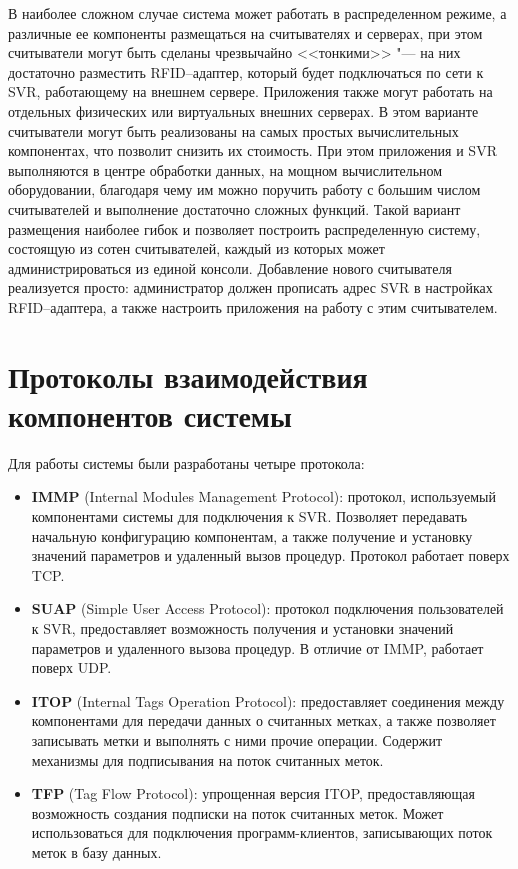 В наиболее сложном случае система может работать в распределенном режиме, а различные ее компоненты размещаться на считывателях и серверах, при этом считыватели могут быть сделаны чрезвычайно <<тонкими>> "--- на них достаточно разместить RFID--адаптер, который будет подключаться по сети к SVR, работающему на внешнем сервере. Приложения также могут работать на отдельных физических или виртуальных внешних серверах. В этом варианте считыватели могут быть реализованы на самых простых вычислительных компонентах, что позволит снизить их стоимость. При этом приложения и SVR выполняются в центре обработки данных, на мощном вычислительном оборудовании, благодаря чему им можно поручить работу с большим числом считывателей и выполнение достаточно сложных функций. Такой вариант размещения наиболее гибок и позволяет построить распределенную систему, состоящую из сотен считывателей, каждый из которых может администрироваться из единой консоли. Добавление нового считывателя реализуется просто: администратор должен прописать адрес SVR в настройках RFID--адаптера, а также настроить приложения на работу с этим считывателем.



\section{Протоколы взаимодействия компонентов системы}\label{sec:ch5_protocols}

Для работы системы были разработаны четыре протокола:

\begin{itemize}
\item{\textbf{IMMP} (Internal Modules Management Protocol): протокол, используемый компонентами системы для подключения к SVR. Позволяет передавать начальную конфигурацию компонентам, а также получение и установку значений параметров и удаленный вызов процедур. Протокол работает поверх TCP.}
\item{\textbf{SUAP} (Simple User Access Protocol): протокол подключения пользователей к SVR, предоставляет возможность получения и установки значений параметров и удаленного вызова процедур. В отличие от IMMP, работает поверх UDP.}
\item{\textbf{ITOP} (Internal Tags Operation Protocol): предоставляет соединения между компонентами для передачи данных о считанных метках, а также позволяет записывать метки и выполнять с ними прочие операции. Содержит механизмы для подписывания на поток считанных меток.}
\item{\textbf{TFP} (Tag Flow Protocol): упрощенная версия ITOP, предоставляющая возможность создания подписки на поток считанных меток. Может использоваться для подключения программ-клиентов, записывающих поток меток в базу данных.}
\end{itemize}

